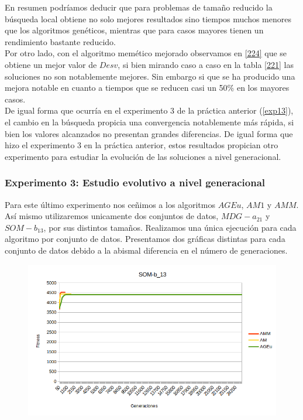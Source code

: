 \documentclass[11pt,a4paper]{article}
\begin{document}
	En resumen podríamos deducir que para problemas de tamaño reducido la búsqueda local obtiene no solo mejores resultados sino tiempos muchos menores que los algoritmos genéticos, mientras que para casos mayores tienen un rendimiento bastante reducido. \\
	
	Por otro lado, con el algoritmo memético mejorado observamos en \ref{224} que se obtiene un mejor valor de $Desv$, si bien mirando caso a caso en la tabla \ref{221} las soluciones no son notablemente mejores. Sin embargo si que se ha producido una mejora notable en cuanto a tiempos que se reducen casi un 50\% en los mayores casos. \\
	
	De igual forma que ocurría en el experimento 3 de la práctica anterior (\ref{exp13}), el cambio en la búsqueda propicia una convergencia notablemente más rápida, si bien los valores alcanzados no presentan grandes diferencias. De igual forma que hizo el experimento 3 en la práctica anterior, estos resultados propician otro experimento para estudiar la evolución de las soluciones a nivel generacional.

	\subsubsection{ Experimento 3: Estudio evolutivo a nivel generacional }

	Para este último experimento nos ceñimos a los algoritmos $AGEu$, $AM1$ y $AMM$. Así mismo utilizaremos unicamente dos conjuntos de datos, $MDG-a_21$ y $SOM-b_13$, por sus distintos tamaños. Realizamos una única ejecución para cada algoritmo por conjunto de datos. Presentamos dos gráficas distintas para cada conjunto de datos debido a la abismal diferencia en el número de generaciones.

	\begin{figure}[H] 
		\centering
		\includegraphics[scale=0.9]{../output/P2/exp3/SOM1}
	\end{figure}
	
\end{document}
